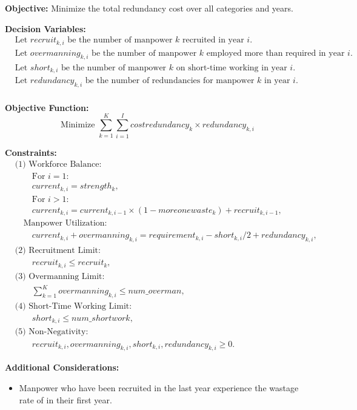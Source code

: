 \documentclass{article}
\begin{document}
\textbf{Objective:} Minimize the total redundancy cost over all categories and years.

\textbf{Decision Variables:}
\begin{align*}
  &\text{Let } recruit_{k,i} \text{ be the number of manpower } k \text{ recruited in year } i. \\
  &\text{Let } overmanning_{k,i} \text{ be the number of manpower } k \text{ employed more than required in year } i. \\
  &\text{Let } short_{k,i} \text{ be the number of manpower } k \text{ on short-time working in year } i. \\
  &\text{Let } redundancy_{k,i} \text{ be the number of redundancies for manpower } k \text{ in year } i. \\
\end{align*}

\textbf{Objective Function:}
\[
\text{Minimize } \sum_{k=1}^{K} \sum_{i=1}^{I} costredundancy_{k} \times redundancy_{k,i}
\]

\textbf{Constraints:}
\begin{align*}
  &\text{(1) Workforce Balance:} \\
  &\qquad \text{For } i = 1: \\
  &\qquad current_{k,i} = strength_k, \\
  &\qquad \text{For } i > 1: \\
  &\qquad current_{k,i} = current_{k,i-1} \times (1 - moreonewaste_{k}) + recruit_{k,i-1}, \\
  &\quad \text{Manpower Utilization: } \\
  &\qquad current_{k,i} + overmanning_{k,i} = requirement_{k,i} - short_{k,i}/2 + redundancy_{k,i},\\
  &\text{(2) Recruitment Limit:} \\
  &\qquad recruit_{k,i} \leq recruit_{k}, \\
  &\text{(3) Overmanning Limit:} \\
  &\qquad \sum_{k=1}^{K} overmanning_{k,i} \leq num\_overman, \\
  &\text{(4) Short-Time Working Limit:} \\
  &\qquad short_{k,i} \leq num\_shortwork, \\
  &\text{(5) Non-Negativity:} \\
  &\qquad recruit_{k,i}, overmanning_{k,i}, short_{k,i}, redundancy_{k,i} \geq 0.
\end{align*}

\textbf{Additional Considerations:}
\begin{itemize}
  \item Manpower who have been recruited in the last year experience the wastage rate of  in their first year.
\end{itemize}
\end{document}
